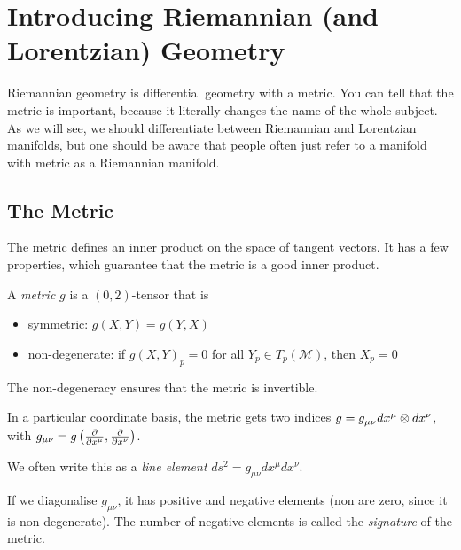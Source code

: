 \chapter{Introducing Riemannian (and Lorentzian) Geometry}%
\label{cha:introducing_riemannian_geometry}

Riemannian geometry is differential geometry with a metric. You can tell that the metric is important, because it literally changes the name of the whole subject.
As we will see, we should differentiate between Riemannian and Lorentzian manifolds, but one should be aware that people often just refer to a manifold with metric as a Riemannian manifold.

\section{The Metric}%
\label{sec:the_metric}

The metric defines an inner product on the space of tangent vectors.
It has a few properties, which guarantee that the metric is a good inner product.
\begin{definition}[metric]
  A \emph{metric} $g$ is a $(0,2)$-tensor that is
  \begin{itemize}
    \item symmetric: $g(X, Y) = g(Y, X)$
    \item non-degenerate: if $g(X, Y)_p = 0$ for all $Y_p \in T_p(\mathcal{M})$, then $X_p = 0$
  \end{itemize}
\end{definition}
\begin{leftbar}
  \begin{remark}
    The non-degeneracy ensures that the metric is invertible.
  \end{remark}
\end{leftbar}
In a particular coordinate basis, the metric gets two indices $g = g \indices{_\mu_\nu} dx^\mu \otimes dx^\nu$, with $g_{\mu \nu} = g \left( \pdv{}{x^\mu}, \pdv{}{x^\nu} \right)$.
\begin{notation}[]
  We often write this as a \emph{line element} $ds^2 = g_{\mu\nu} dx^\mu dx^\nu$.
\end{notation}
\begin{definition}[signature]
  If we diagonalise $g_{\mu\nu}$, it has positive and negative elements (non are zero, since it is non-degenerate). The number of negative elements is called the \emph{signature} of the metric.
\end{definition}

